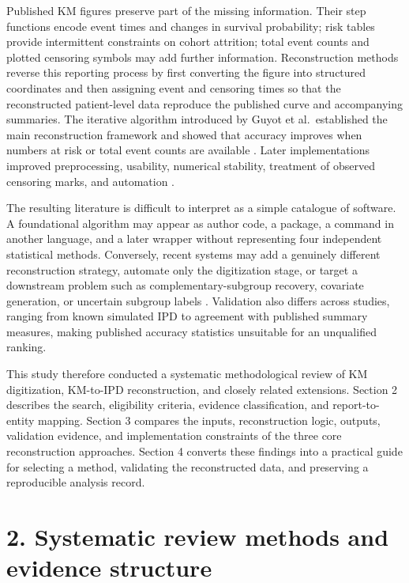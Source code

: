 \documentclass[12pt,letterpaper]{article}
\begin{document}
Published KM figures preserve part of the missing information. Their step functions encode event times and changes in survival probability; risk tables provide intermittent constraints on cohort attrition; total event counts and plotted censoring symbols may add further information. Reconstruction methods reverse this reporting process by first converting the figure into structured coordinates and then assigning event and censoring times so that the reconstructed patient-level data reproduce the published curve and accompanying summaries. The iterative algorithm introduced by Guyot et al.~established the main reconstruction framework and showed that accuracy improves when numbers at risk or total event counts are available \cite{guyot2012}. Later implementations improved preprocessing, usability, numerical stability, treatment of observed censoring marks, and automation \cite{wei2017,liu2021,rogula2022,zhang2024}.

The resulting literature is difficult to interpret as a simple catalogue of software. A foundational algorithm may appear as author code, a package, a command in another language, and a later wrapper without representing four independent statistical methods. Conversely, recent systems may add a genuinely different reconstruction strategy, automate only the digitization stage, or target a downstream problem such as complementary-subgroup recovery, covariate generation, or uncertain subgroup labels \cite{zhao2022,kmgpt2025,synthipd2026,resolve2026}. Validation also differs across studies, ranging from known simulated IPD to agreement with published summary measures, making published accuracy statistics unsuitable for an unqualified ranking.

This study therefore conducted a systematic methodological review of KM digitization, KM-to-IPD reconstruction, and closely related extensions. Section 2 describes the search, eligibility criteria, evidence classification, and report-to-entity mapping. Section 3 compares the inputs, reconstruction logic, outputs, validation evidence, and implementation constraints of the three core reconstruction approaches. Section 4 converts these findings into a practical guide for selecting a method, validating the reconstructed data, and preserving a reproducible analysis record.

\section*{2. Systematic review methods and evidence structure}
\end{document}
